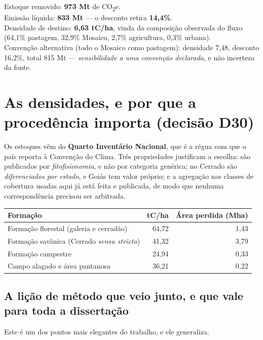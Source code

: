 \begin{ancora}[Os números]
Estoque removido: \textbf{973 Mt} de CO\textsubscript{2}e. \\
Emissão líquida: \textbf{833 Mt} --- o desconto retira \textbf{14,4\%}. \\
Densidade de destino: \textbf{6,63 tC/ha}, vinda da composição observada do
fluxo (64,1\% pastagem, 32,9\% Mosaico, 2,7\% agricultura, 0,3\% urbana). \\
Convenção alternativa (todo o Mosaico como pastagem): densidade 7,48, desconto
16,2\%, total 815 Mt --- \emph{sensibilidade a uma convenção declarada}, e não
incerteza da fonte.
\end{ancora}

\section{As densidades, e por que a procedência importa (decisão D30)}

Os estoques vêm do \textbf{Quarto Inventário Nacional}, que é a régua com que o
país reporta à Convenção do Clima. Três propriedades justificam a escolha: são
publicados por \emph{fitofisionomia}, e não por categoria genérica; no Cerrado
são \emph{diferenciados por estado}, e Goiás tem valor próprio; e a agregação
nas classes de cobertura usadas aqui já está feita e publicada, de modo que
nenhuma correspondência precisou ser arbitrada.

\vspace{6pt}
\begin{tabular}{@{}lrr@{}}
\toprule
\textbf{Formação} & \textbf{tC/ha} & \textbf{Área perdida (Mha)} \\
\midrule
Formação florestal (galeria e cerradão) & 64,72 & 1,43 \\
Formação savânica (Cerrado \emph{sensu stricto}) & 41,32 & 3,79 \\
Formação campestre & 24,94 & 0,33 \\
Campo alagado e área pantanosa & 36,21 & 0,22 \\
\bottomrule
\end{tabular}

\vspace{10pt}
\subsection{A lição de método que veio junto, e que vale para toda a dissertação}

Este é um dos pontos mais elegantes do trabalho, e ele generaliza.

